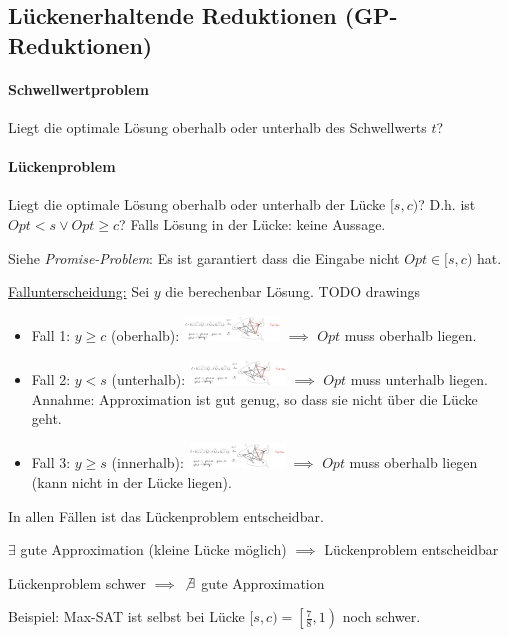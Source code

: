 \subsection{Lückenerhaltende Reduktionen (GP-Reduktionen)}

\paragraph{Schwellwertproblem}
Liegt die optimale Lösung oberhalb oder unterhalb des Schwellwerts $t$?

\paragraph{Lückenproblem}
Liegt die optimale Lösung oberhalb oder unterhalb der Lücke $[s,c)$? D.h. ist $Opt < s \vee Opt \geq c$?
Falls Lösung in der Lücke: keine Aussage.

Siehe \emph{Promise-Problem}: Es ist garantiert dass die Eingabe nicht $Opt \in [s, c)$ hat.

\underline{Fallunterscheidung:} Sei $y$ die berechenbar Lösung.
TODO drawings
\begin{itemize}
    \item Fall 1: $y \geq c$ (oberhalb):
        \includegraphics[width=0.2\textwidth]{images/ap-reduktion-beispiel.png}
        $\implies$ $Opt$ muss oberhalb liegen.
    \item Fall 2: $y < s$ (unterhalb):
        \includegraphics[width=0.2\textwidth]{images/ap-reduktion-beispiel.png}
        $\implies$ $Opt$ muss unterhalb liegen. \\
        Annahme: Approximation ist gut genug, so dass sie nicht über die Lücke geht.
    \item Fall 3: $y \geq s$ (innerhalb):
        \includegraphics[width=0.2\textwidth]{images/ap-reduktion-beispiel.png}
        $\implies$ $Opt$ muss oberhalb liegen (kann nicht in der Lücke liegen).
\end{itemize}
In allen Fällen ist das Lückenproblem entscheidbar.
%
\begin{center}
    $\exists$ gute Approximation (kleine Lücke möglich) $\implies$ Lückenproblem entscheidbar

    Lückenproblem schwer $\implies$ $\not \exists$ gute Approximation
\end{center}
%
Beispiel:
Max-SAT ist selbst bei Lücke $ [s,c) = \left[ \frac{7}{8}, 1 \right) $ noch schwer.

